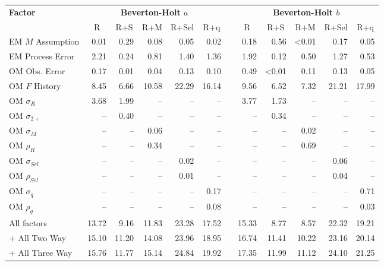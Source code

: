 \begin{center}
\begin{tabular}{lrrrrrcrrrrr}
\hline\hline
\multicolumn{1}{l}{\bfseries Factor}&\multicolumn{5}{c}{\bfseries Beverton-Holt $a$}&\multicolumn{1}{c}{\bfseries }&\multicolumn{5}{c}{\bfseries Beverton-Holt $b$}\tabularnewline
\cline{2-6} \cline{8-12}
\multicolumn{1}{l}{}&\multicolumn{1}{c}{R}&\multicolumn{1}{c}{R+S}&\multicolumn{1}{c}{R+M}&\multicolumn{1}{c}{R+Sel}&\multicolumn{1}{c}{R+q}&\multicolumn{1}{c}{}&\multicolumn{1}{c}{R}&\multicolumn{1}{c}{R+S}&\multicolumn{1}{c}{R+M}&\multicolumn{1}{c}{R+Sel}&\multicolumn{1}{c}{R+q}\tabularnewline
\hline
EM $M$ Assumption& 0.01& 0.29& 0.08& 0.05& 0.02&& 0.18& 0.56&\textless  0.01& 0.17& 0.05\tabularnewline
EM Process Error& 2.21& 0.24& 0.81& 1.40& 1.36&& 1.92& 0.12& 0.50& 1.27& 0.53\tabularnewline
OM Obs. Error& 0.17& 0.01& 0.04& 0.13& 0.10&& 0.49&\textless  0.01& 0.11& 0.13& 0.05\tabularnewline
OM $F$ History& 8.45& 6.66&10.58&22.29&16.14&& 9.56& 6.52& 7.32&21.21&17.99\tabularnewline
OM $\sigma_R$& 3.68& 1.99&--&--&--&& 3.77& 1.73&--&--&--\tabularnewline
OM $\sigma_{2+}$ &--& 0.40&--&--&--&&--& 0.34&--&--&--\tabularnewline
OM $\sigma_M$&--&--& 0.06&--&--&&--&--& 0.02&--&--\tabularnewline
OM $\rho_R$&--&--& 0.34&--&--&&--&--& 0.69&--&--\tabularnewline
OM $\sigma_{Sel}$&--&--&--& 0.02&--&&--&--&--& 0.06&--\tabularnewline
OM $\rho_{Sel}$&--&--&--& 0.01&--&&--&--&--& 0.04&--\tabularnewline
OM $\sigma_q$&--&--&--&--& 0.17&&--&--&--&--& 0.71\tabularnewline
OM $\rho_q$&--&--&--&--& 0.08&&--&--&--&--& 0.03\tabularnewline
All factors&13.72& 9.16&11.83&23.28&17.52&&15.33& 8.77& 8.57&22.32&19.21\tabularnewline
+ All Two Way&15.10&11.20&14.08&23.96&18.95&&16.74&11.41&10.22&23.16&20.14\tabularnewline
+ All Three Way&15.76&11.77&15.14&24.84&19.92&&17.35&11.99&11.12&24.10&21.25\tabularnewline
\hline
\end{tabular}\end{center}
